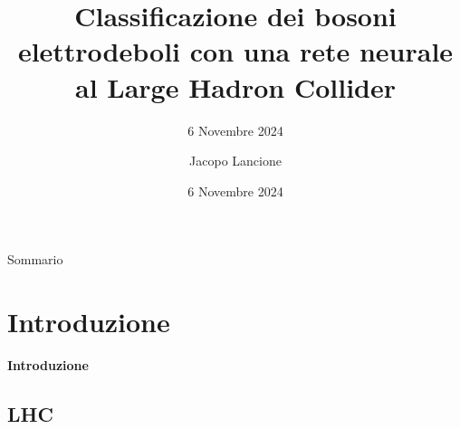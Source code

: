 \documentclass{beamer}
\title{Classificazione dei bosoni elettrodeboli con una rete neurale al Large Hadron Collider}
\subtitle{6 Novembre 2024}
\date{6 Novembre 2024}
\author{Jacopo Lancione}
\begin{document}
\begin{frame}
    \titlepage
\end{frame}

\begin{frame}{Sommario}
    \tableofcontents
\end{frame}


\section{Introduzione}
\begin{frame}
  \centering
  \Huge\bfseries
  Introduzione
\end{frame}

\subsection{LHC}
\end{document}
